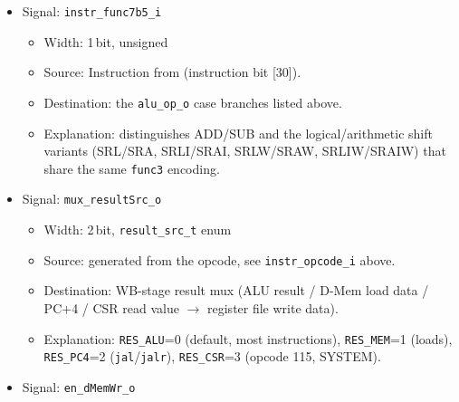 \begin{itemize}
\begin{itemize}
\begin{itemize}
      \item opcode=59 (register, word width): func3=000 $\to$
        \texttt{ALU\_ADDW} (\texttt{func7b5\_i}=0) or \texttt{ALU\_SUBW} (=1);
        001 $\to$ \texttt{ALU\_SLLW}; 101 $\to$ \texttt{ALU\_SRLW}
        (\texttt{func7b5\_i}=0) or \texttt{ALU\_SRAW} (=1)
    \end{itemize}
    \item Explanation (\texttt{br\_op\_o} selection, opcode=99): func3=000
      $\to$ \texttt{BR\_EQ} (\texttt{beq}); 001 $\to$ \texttt{BR\_NE}
      (\texttt{bne}); 100 $\to$ \texttt{BR\_LT} (\texttt{blt}); 101 $\to$
      \texttt{BR\_GE} (\texttt{bge}); 110 $\to$ \texttt{BR\_LTU}
      (\texttt{bltu}); 111 $\to$ \texttt{BR\_GEU} (\texttt{bgeu}); 010/011
      $\to$ \texttt{trap\_illegal\_instr\_o}=1 (reserved encodings).
  \end{itemize}
  \item Signal: \texttt{instr\_func7b5\_i}
  \begin{itemize}
    \item Width: 1\,bit, unsigned
    \item Source: Instruction from  (instruction bit [30]).
    \item Destination: the \texttt{alu\_op\_o} case branches listed above.
    \item Explanation: distinguishes ADD/SUB and the logical/arithmetic
      shift variants (SRL/SRA, SRLI/SRAI, SRLW/SRAW, SRLIW/SRAIW) that
      share the same \texttt{func3} encoding.
  \end{itemize}
  \item Signal: \texttt{mux\_resultSrc\_o}
  \begin{itemize}
    \item Width: 2\,bit, \texttt{result\_src\_t} enum
    \item Source: generated from the opcode, see \texttt{instr\_opcode\_i} above.
    \item Destination: WB-stage result mux (ALU result / D-Mem load data /
      PC+4 / CSR read value $\to$ register file write data).
    \item Explanation: \texttt{RES\_ALU}=0 (default, most instructions),
      \texttt{RES\_MEM}=1 (loads), \texttt{RES\_PC4}=2 (\texttt{jal}/\texttt{jalr}),
      \texttt{RES\_CSR}=3 (opcode 115, SYSTEM).
  \end{itemize}
  \item Signal: \texttt{en\_dMemWr\_o}
  \begin{itemize}

\end{itemize}
\end{itemize}
